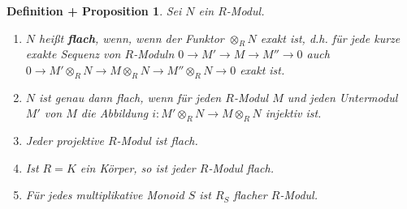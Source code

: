 \documentclass[a4paper,12pt]{scrbook}
\theoremstyle{break}
\newtheorem{DefProp}[Def]{Definition + Proposition}
\theoremstyle{nonumberbreak}
\theoremstyle{nonumberplain}
\newcommand{\emp}[1]{\textbf{\emph{#1}}}
\begin{document}

\begin{DefProp}
\label{1.13}
  Sei $N$ ein $R$-Modul.
  \begin{enumerate}
    \item $N$ hei\ss t \emp{flach}, wenn, wenn der Funktor $\otimes_R N$ exakt ist,
    d.h. für jede kurze exakte Sequenz von $R$-Moduln 
    $0\to M'\to M\to M''\to 0$
    auch $0\to M'\otimes_R N\to M\otimes_R N\to M''\otimes_R N\to 0$ exakt ist.
    \item $N$ ist genau dann flach, wenn für jeden $R$-Modul $M$ und jeden Untermodul $M'$ von $M$
    die Abbildung $i:M'\otimes_R N\to M\otimes_R N$ injektiv ist.
    \item Jeder projektive $R$-Modul ist flach.
    \item Ist $R=K$ ein Körper, so ist jeder $R$-Modul flach.
    \item Für jedes multiplikative Monoid $S$ ist $R_S$ flacher $R$-Modul.
  \end{enumerate}
\end{DefProp}
\end{document}
